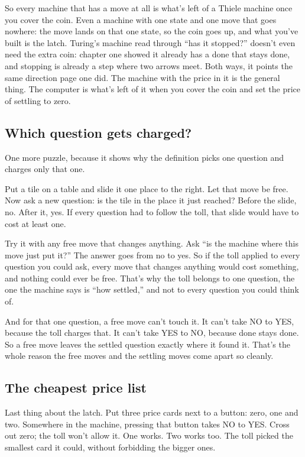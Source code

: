 \documentclass[11pt,twoside]{article}
\theoremstyle{thielethm}
\theoremstyle{thieledef}
\theoremstyle{thieledef}
\theoremstyle{thieledef}
\theoremstyle{thielethm}
\theoremstyle{thieleobs}
\theoremstyle{thielethm}
\begin{document}
So every machine that has a move at all is what's left of a Thiele machine once you cover the coin. Even a machine with one state and one move that goes nowhere: the move lands on that one state, so the coin goes up, and what you've built is the latch. Turing's machine read through ``has it stopped?'' doesn't even need the extra coin: chapter one showed it already has a done that stays done, and stopping is already a step where two arrows meet. Both ways, it points the same direction page one did. The machine with the price in it is the general thing. The computer is what's left of it when you cover the coin and set the price of settling to zero.

\subsection{Which question gets charged?}

One more puzzle, because it shows why the definition picks one question and charges only that one.

Put a tile on a table and slide it one place to the right. Let that move be free. Now ask a new question: is the tile in the place it just reached? Before the slide, no. After it, yes. If every question had to follow the toll, that slide would have to cost at least one.

Try it with any free move that changes anything. Ask ``is the machine where this move just put it?'' The answer goes from no to yes. So if the toll applied to every question you could ask, every move that changes anything would cost something, and nothing could ever be free. That's why the toll belongs to one question, the one the machine says is ``how settled,'' and not to every question you could think of.

And for that one question, a free move can't touch it. It can't take NO to YES, because the toll charges that. It can't take YES to NO, because done stays done. So a free move leaves the settled question exactly where it found it. That's the whole reason the free moves and the settling moves come apart so cleanly.

\subsection{The cheapest price list}

Last thing about the latch. Put three price cards next to a button: zero, one and two. Somewhere in the machine, pressing that button takes NO to YES. Cross out zero; the toll won't allow it. One works. Two works too. The toll picked the smallest card it could, without forbidding the bigger ones.
\end{document}
